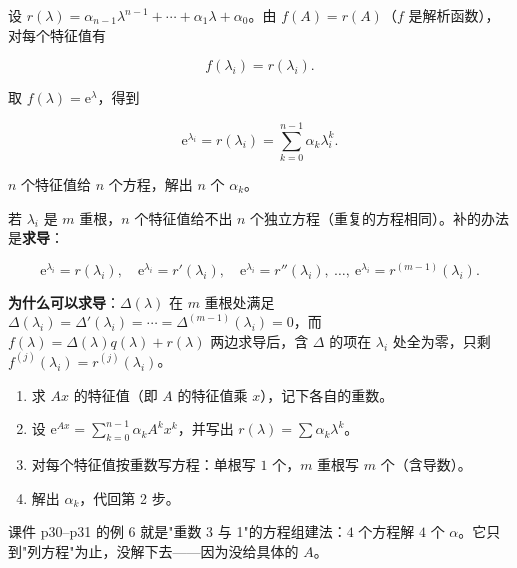 \documentclass[11pt]{ctexart}
\begin{document}

设 $r(\lambda)=\alpha_{n-1}\lambda^{n-1}+\cdots+\alpha_1\lambda+\alpha_0$。由 $f(A)=r(A)$（$f$ 是解析函数），对每个特征值有

\[
f(\lambda_i)=r(\lambda_i).
\]

取 $f(\lambda)=\mathrm{e}^{\lambda}$，得到

\[
\mathrm{e}^{\lambda_i}=r(\lambda_i)=\sum_{k=0}^{n-1}\alpha_k\lambda_i^k .
\]

$n$ 个特征值给 $n$ 个方程，解出 $n$ 个 $\alpha_k$。



若 $\lambda_i$ 是 $m$ 重根，$n$ 个特征值给不出 $n$ 个独立方程（重复的方程相同）。补的办法是\textbf{求导}：

\[
\mathrm{e}^{\lambda_i}=r(\lambda_i),\quad
\mathrm{e}^{\lambda_i}=r'(\lambda_i),\quad
\mathrm{e}^{\lambda_i}=r''(\lambda_i),\ \dots,\
\mathrm{e}^{\lambda_i}=r^{(m-1)}(\lambda_i).
\]

\textbf{为什么可以求导}：$\Delta(\lambda)$ 在 $m$ 重根处满足 $\Delta(\lambda_i)=\Delta'(\lambda_i)=\cdots=\Delta^{(m-1)}(\lambda_i)=0$，而 $f(\lambda)=\Delta(\lambda)q(\lambda)+r(\lambda)$ 两边求导后，含 $\Delta$ 的项在 $\lambda_i$ 处全为零，只剩 $f^{(j)}(\lambda_i)=r^{(j)}(\lambda_i)$。


\begin{enumerate}
  \item 求 $Ax$ 的特征值（即 $A$ 的特征值乘 $x$），记下各自的重数。
  \item 设 $\mathrm{e}^{Ax}=\sum_{k=0}^{n-1}\alpha_kA^kx^k$，并写出 $r(\lambda)=\sum\alpha_k\lambda^k$。
  \item 对每个特征值按重数写方程：单根写 $1$ 个，$m$ 重根写 $m$ 个（含导数）。
  \item 解出 $\alpha_k$，代回第 2 步。
\end{enumerate}

课件 p30--p31 的例 6 就是"重数 3 与 1"的方程组建法：$4$ 个方程解 $4$ 个 $\alpha$。它只到"列方程"为止，没解下去——因为没给具体的 $A$。
\end{document}
